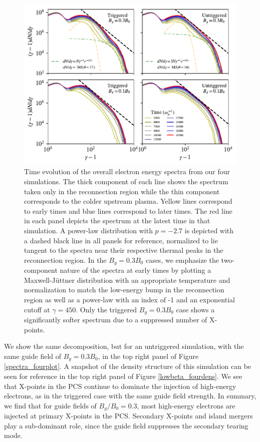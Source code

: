 \begin{figure}[t]
	\includegraphics[width=\linewidth]{2x2_timespec_2comp_reord.pdf}
	\caption{Time evolution of the overall electron energy spectra from our four simulations.  The thick component of each line shows the spectrum taken only in the reconnection region while the thin component corresponds to the colder upstream plasma.  Yellow lines correspond to early times and blue lines correspond to later times.  The red line in each panel depicts the spectrum at the latest time in that simulation.  A power-law distribution with $p=-2.7$ is depicted with a dashed black line in all panels for reference, normalized to lie tangent to the spectra near their respective thermal peaks in the reconnection region.  In the $B_{g}=0.3B_{0}$ cases, we emphasize the two-component nature of the spectra at early times by plotting a Maxwell-J\"{u}ttner distribution with an appropriate temperature and normalization to match the low-energy bump in the reconnection region as well as a power-law with an index of -1 and an exponential cutoff at $\gamma=450$. 		
		Only the triggered $B_{g}=0.3B_{0}$ case shows a significantly softer spectrum due to a suppressed number of X-points.}
	\label{2x2_timespec}
\end{figure}
We show the same decomposition, but for an untriggered simulation, with the same guide field of $B_{g}=0.3B_{0}$, in the top right panel of Figure \ref{spectra_fourplot}.  A snapshot of the density structure of this simulation can be seen for reference in the top right panel of Figure \ref{lowbeta_fourdens}.   We see that X-points in the PCS continue to dominate the injection of high-energy electrons, as in the triggered case with the same guide field strength.  In summary, we find that for guide fields of $B_{g}/B_{0}=0.3$, most high-energy electrons are injected at primary X-points in the PCS. Secondary X-points and island mergers play a sub-dominant role, since the guide field suppresses the secondary tearing mode.

